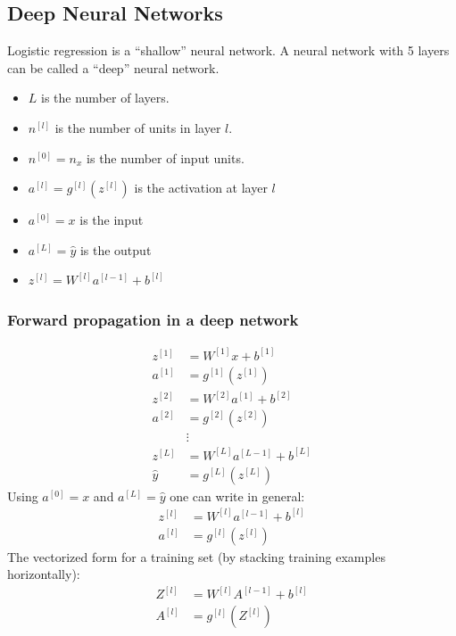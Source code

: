 \documentclass{article}
\begin{document}
\subsection{Deep Neural Networks}
Logistic regression is a ``shallow'' neural network.
A neural network with 5 layers can be called a ``deep'' neural network.
\begin{itemize}
  \item $L$ is the number of layers.
  \item $n^{[l]}$ is the number of units in layer $l$.
  \item $n^{[0]}=n_x$ is the number of input units.
  \item $a^{[l]}=g^{[l]}(z^{[l]})$ is the activation at layer $l$
  \item $a^{[0]}=x$ is the input
  \item $a^{[L]}=\hat{y}$ is the output
  \item $z^{[l]}=W^{[l]}a^{[l-1]}+b^{[l]}$
\end{itemize}

\subsubsection{Forward propagation in a deep network}
\begin{equation}
  \begin{split}
    z^{[1]}&=W^{[1]}x+b^{[1]}\\
    a^{[1]}&=g^{[1]}(z^{[1]})\\
    z^{[2]}&=W^{[2]}a^{[1]}+b^{[2]}\\
    a^{[2]}&=g^{[2]}(z^{[2]})\\
    &\vdots\\
    z^{[L]}&=W^{[L]}a^{[L-1]}+b^{[L]}\\
    \hat{y}&=g^{[L]}(z^{[L]})
  \end{split}
\end{equation}
Using $a^{[0]}=x$ and $a^{[L]}=\hat{y}$ one can write in general:
\begin{equation}
  \begin{split}
    z^{[l]}&=W^{[l]}a^{[l-1]}+b^{[l]}\\
    a^{[l]}&=g^{[l]}(z^{[l]})
  \end{split}
\end{equation}
The vectorized form for a training set (by stacking training examples horizontally):
\begin{equation}
  \begin{split}
    Z^{[l]}&=W^{[l]}A^{[l-1]}+b^{[l]}\\
    A^{[l]}&=g^{[l]}(Z^{[l]})
  \end{split}
\end{equation}
\end{document}
